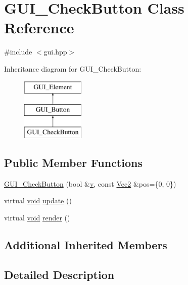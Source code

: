 \hypertarget{class_g_u_i___check_button}{\section{G\-U\-I\-\_\-\-Check\-Button Class Reference}
\label{class_g_u_i___check_button}
}


{\ttfamily \#include $<$gui.\-hpp$>$}

Inheritance diagram for G\-U\-I\-\_\-\-Check\-Button\-:\begin{figure}[H]
\begin{center}
\leavevmode
\includegraphics[height=3.000000cm]{class_g_u_i___check_button}
\end{center}
\end{figure}
\subsection*{Public Member Functions}
\begin{DoxyCompactItemize}
\item 
\hyperlink{class_g_u_i___check_button_aba6479582920de3b7637b6c1c55ed5e9}{G\-U\-I\-\_\-\-Check\-Button} (bool \&\hyperlink{_s_d_l__opengl_8h_a10a82eabcb59d2fcd74acee063775f90}{v}, const \hyperlink{class_vec2}{Vec2} \&pos=\{0, 0\})
\item 
virtual \hyperlink{_s_d_l__opengles2__gl2ext_8h_ae5d8fa23ad07c48bb609509eae494c95}{void} \hyperlink{class_g_u_i___check_button_ae1904db9a44fb764357a0d4aab53b994}{update} ()
\item 
virtual \hyperlink{_s_d_l__opengles2__gl2ext_8h_ae5d8fa23ad07c48bb609509eae494c95}{void} \hyperlink{class_g_u_i___check_button_a614090bd8dba2c68b1a780fc44a7c590}{render} ()
\end{DoxyCompactItemize}
\subsection*{Additional Inherited Members}


\subsection{Detailed Description}


